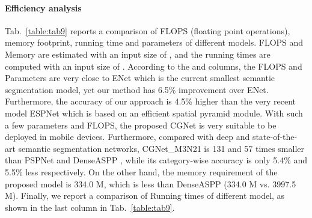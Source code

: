 \documentclass[10pt,twocolumn,letterpaper]{article}
\begin{document}
\paragraph{Efficiency analysis}
Tab.~\ref{table:tab9} reports a comparison of FLOPS (floating point operations), memory footprint, running time and parameters of different models. FLOPS and Memory are estimated with an input size of , and the running times are computed with an input size of . According to the  and  columns, the FLOPS and Parameters are very close to ENet which is the current smallest semantic segmentation model, yet our method has 6.5\% improvement over ENet. Furthermore, the accuracy of our approach is 4.5\% higher than the very recent model ESPNet \cite{mehta2018espnet} which is based on an efficient spatial pyramid module. With such a few parameters and FLOPS, the proposed CGNet is very suitable to be deployed in mobile devices. Furthermore, compared with deep and state-of-the-art semantic segmentation networks, CGNet\_M3N21 is 131 and 57 times smaller than PSPNet \cite{Zhao_2017_CVPR} and DenseASPP \cite{yang2018denseaspp}, while its category-wise accuracy is only 5.4\% and 5.5\% less respectively. On the other hand, the memory requirement of the proposed model is 334.0 M, which is  less than DenseASPP \cite{yang2018denseaspp} (334.0 M vs. 3997.5 M). Finally, we report a comparison of Running times of different model, as shown in the last column in Tab.~\ref{table:tab9}.
\end{document}
